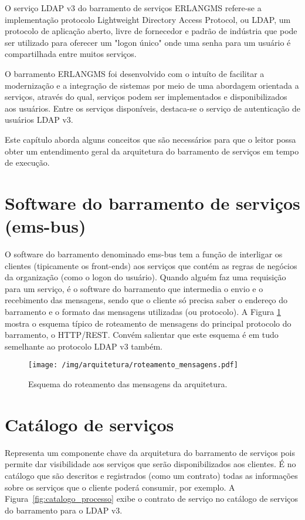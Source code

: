 O serviço LDAP v3 do barramento de serviços ERLANGMS
refere-se a implementação protocolo
Lightweight Directory Access Protocol, ou LDAP,
um protocolo de aplicação aberto, livre de fornecedor e 
padrão de indústria que pode ser utilizado para oferecer
um "logon único" onde uma senha para um usuário é
compartilhada entre muitos serviços.

O barramento ERLANGMS foi desenvolvido 
com o intuíto de facilitar a modernização e a integração de 
sistemas por meio de uma abordagem orientada a serviços,
através do qual, serviços podem ser implementados e
disponibilizados aos usuários. Entre 
os serviços disponíveis, destaca-se
o serviço de autenticação de usuários LDAP v3.

Este capítulo aborda alguns conceitos que são
necessários para que o leitor possa obter um entendimento geral 
da arquitetura do barramento de serviços em tempo de execução.


\section{Software do barramento de serviços (ems-bus)}

O software do barramento denominado ems-bus 
tem a função de interligar os clientes (tipicamente os front-ends) 
aos serviços que contém as regras de negócios da organização (como o logon do usuário). 
Quando alguém faz uma requisição para um serviço, é o software do barramento 
que intermedia o envio e o recebimento das mensagens, sendo que o cliente
só precisa saber o endereço do barramento e o formato das mensagens utilizadas (ou protocolo). A 
Figura \ref{fig:roteamento_mensagens} mostra o esquema típico de
roteamento de mensagens do principal protocolo do barramento, o HTTP/REST. 
Convém salientar que este esquema é em tudo semelhante
ao protocolo LDAP v3 também.

\begin{figure}[htb]
\centering
\texttt{[image: /img/arquitetura/roteamento\_mensagens.pdf]}
\caption{Esquema do roteamento das mensagens da arquitetura.}
\label{fig:roteamento_mensagens}
\end{figure}
\FloatBarrier


\section{Catálogo de serviços}

Representa um componente chave da arquitetura do barramento de serviços pois permite
dar visibilidade aos serviços que serão disponibilizados aos clientes. É no catálogo
que são descritos e registrados (como um contrato) todas as informações sobre os serviços
que o cliente poderá consumir, por exemplo. A Figura~\ref{fig:catalogo_processo} exibe 
o contrato de serviço no catálogo 
de serviços do barramento para o LDAP v3.


